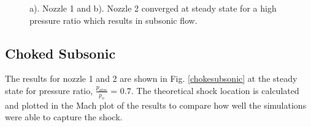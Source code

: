\documentclass{article}%
\numberwithin{equation}{section}
\begin{document}
\pagebreak

\begin{figure}[h!]
\caption{a). Nozzle 1 and b). Nozzle 2 converged at steady state for a high pressure ratio which results in subsonic flow. \label{subsonic}}
\end{figure}

\subsection{Choked Subsonic}
The results for nozzle 1 and 2 are shown in Fig. \ref{chokesubsonic} at the steady state for pressure ratio, $\frac{p_{atm}}{p_o}$ = 0.7. The theoretical shock location is calculated and plotted in the Mach plot of the results to compare how well the simulations were able to capture the shock.
\end{document}
